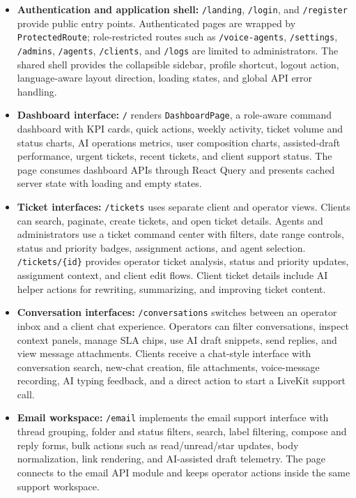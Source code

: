 \begin{itemize}
    \item \textbf{Authentication and application shell:} \texttt{/landing}, \texttt{/login}, and \texttt{/register} provide public entry points. Authenticated pages are wrapped by \texttt{ProtectedRoute}; role-restricted routes such as \texttt{/voice-agents}, \texttt{/settings}, \texttt{/admins}, \texttt{/agents}, \texttt{/clients}, and \texttt{/logs} are limited to administrators. The shared shell provides the collapsible sidebar, profile shortcut, logout action, language-aware layout direction, loading states, and global API error handling.
    \item \textbf{Dashboard interface:} \texttt{/} renders \texttt{DashboardPage}, a role-aware command dashboard with KPI cards, quick actions, weekly activity, ticket volume and status charts, AI operations metrics, user composition charts, assisted-draft performance, urgent tickets, recent tickets, and client support status. The page consumes dashboard APIs through React Query and presents cached server state with loading and empty states.
    \item \textbf{Ticket interfaces:} \texttt{/tickets} uses separate client and operator views. Clients can search, paginate, create tickets, and open ticket details. Agents and administrators use a ticket command center with filters, date range controls, status and priority badges, assignment actions, and agent selection. \texttt{/tickets/\{id\}} provides operator ticket analysis, status and priority updates, assignment context, and client edit flows. Client ticket details include AI helper actions for rewriting, summarizing, and improving ticket content.
    \item \textbf{Conversation interfaces:} \texttt{/conversations} switches between an operator inbox and a client chat experience. Operators can filter conversations, inspect context panels, manage SLA chips, use AI draft snippets, send replies, and view message attachments. Clients receive a chat-style interface with conversation search, new-chat creation, file attachments, voice-message recording, AI typing feedback, and a direct action to start a LiveKit support call.
    \item \textbf{Email workspace:} \texttt{/email} implements the email support interface with thread grouping, folder and status filters, search, label filtering, compose and reply forms, bulk actions such as read/unread/star updates, body normalization, link rendering, and AI-assisted draft telemetry. The page connects to the email API module and keeps operator actions inside the same support workspace.

\end{itemize}
